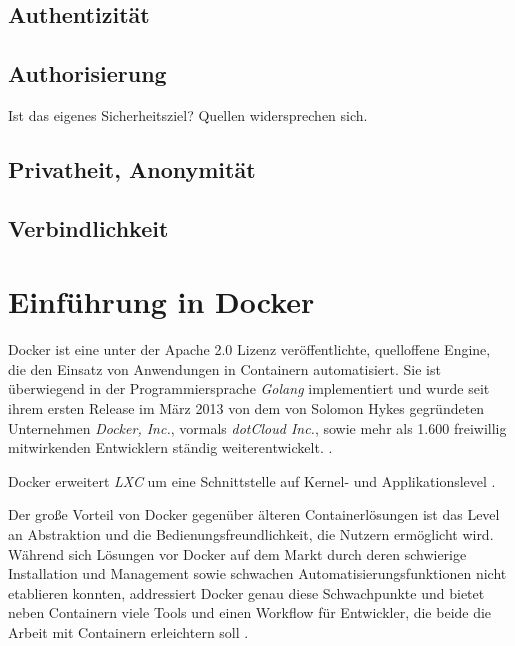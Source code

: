 \documentclass[../main.tex]{subfiles}
\begin{document}
    \subsection{Authentizität}
    \subsection{Authorisierung}
      Ist das eigenes Sicherheitsziel? Quellen widersprechen sich.
    \subsection{Privatheit, Anonymität}
    \subsection{Verbindlichkeit}
  \section{Einführung in Docker}
  \label{dockerIntro}
    Docker ist eine unter der Apache 2.0 Lizenz veröffentlichte, quelloffene Engine, die den Einsatz von Anwendungen in Containern automatisiert. Sie ist überwiegend in der Programmiersprache \emph{Golang} implementiert und wurde seit ihrem ersten Release im März 2013 von dem von Solomon Hykes gegründeten Unternehmen \emph{Docker, Inc.}\cite{dockerHykes}, vormals \emph{dotCloud Inc.}, sowie mehr als 1.600 freiwillig mitwirkenden Entwicklern ständig weiterentwickelt. \cite{githubDocker}\cite[S.7]{dockerBook}\cite{githubDockerChangelog}\cite{dockerCompany}.

    Docker erweitert \emph{LXC} um eine Schnittstelle auf Kernel- und Applikationslevel \cite[S.2]{dockerLXCKub}.



    Der große Vorteil von Docker gegenüber älteren Containerlösungen ist das Level an Abstraktion und die Bedienungsfreundlichkeit, die Nutzern ermöglicht wird. Während sich Lösungen vor Docker auf dem Markt durch deren schwierige Installation und Management sowie schwachen Automatisierungsfunktionen nicht etablieren konnten, addressiert Docker genau diese Schwachpunkte \cite[S.7]{dockerBook} und bietet neben Containern viele Tools und einen Workflow für Entwickler, die beide die Arbeit mit Containern erleichtern soll \cite[S.1]{dockerIntroIEEE}.
\end{document}
